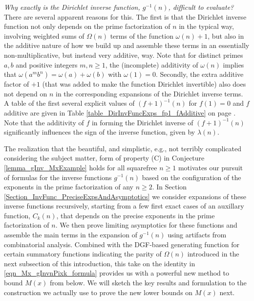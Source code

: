 \documentclass[11pt,reqno,a4letter]{article}
\numberwithin{figure}{section}
\numberwithin{table}{section}
\theoremstyle{plain}
\numberwithin{theorem}{section}
\theoremstyle{definition}
\begin{document}
\textit{Why exactly is the Dirichlet inverse function, $g^{-1}(n)$, difficult to evaluate? } 
There are several apparent reasons for this. The first is that the Dirichlet inverse function not only 
depends on the prime factorization of $n$ in the typical way, involving weighted sums of $\Omega(n)$ terms of the 
function $\omega(n) + 1$, but also in the additive nature of how we build up and assemble these terms in an essentially 
non-multiplicative, but instead very additive, way.  
Note that for distinct primes $a,b$ and positive integers $m,n \geq 1$, the 
(incomplete) additivity of $\omega(n)$ implies that $\omega(a^m b^n) = \omega(a) + \omega(b)$ with  
$\omega(1) = 0$. Secondly, the extra additive factor of $+1$ (that was added to make the function Dirichlet invertible) 
also does not depend on $n$ in the corresponding expansions of the Dirichlet inverse terms. 
A table of the first several explicit values of $(f+1)^{-1}(n)$ for $f(1) = 0$ and $f$ additive
are given in Table \ref{table_DirInvFuncExps_fp1_fAdditive} on page 
\pageref{table_DirInvFuncExps_fp1_fAdditive}. 
Note that the additivity of $f$ in forming the Dirichlet inverse of $(f+1)^{-1}(n)$ significantly influences the 
sign of the inverse function, given by $\lambda(n)$. 

The realization that the beautiful, and simplistic, e.g., not terribly complicated considering the 
subject matter, form of property (C) 
in Conjecture \ref{lemma_gInv_MxExample} holds for all squarefree $n \geq 1$ 
motivates our pursuit of formulas for the inverse functions $g^{-1}(n)$ based on the configuration of the 
exponents in the prime factorization of any $n \geq 2$. 
In Section \ref{Section_InvFunc_PreciseExpsAndAsymptotics} we consider expansions of these inverse functions 
recursively, starting from a few first exact cases of an auxillary function, $C_k(n)$, 
that depends on the precise exponents in the prime factorization of $n$. 
We then prove limiting asymptotics for these functions and assemble the main terms in the expansion of 
$g^{-1}(n)$ using artifacts from combinatorial analysis. 
Combined with the DGF-based generating function for certain summatory functions indicating the parity of 
$\Omega(n)$ introduced in the next subsection of this introduction, 
this take on the identity in \eqref{eqn_Mx_gInvnPixk_formula} provides us with a powerful new method to 
bound $M(x)$ from below. 
We will sketch the key results and formulation to the construction we actually use to prove the 
new lower bounds on $M(x)$ next. 
\end{document}
